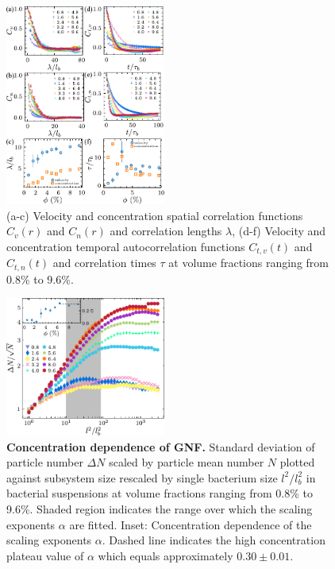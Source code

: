 \documentclass[twocolumn,aps,prl,amsmath,amssymb,longbibliography]{revtex4-2}
\begin{document}
\begin{figure}[ht]
\begin{center}
\includegraphics[width=0.47\textwidth]{figures/spatiotemporal-correlations/v3.pdf}
\caption[spatiotemporal-correlations.]
{
(a-c) Velocity and concentration spatial correlation functions $C_{v}(r)$  and $C_{n}(r)$ and correlation lengths $\lambda$,
(d-f) Velocity and concentration temporal autocorrelation functions $C_{t, v}(t)$  and $C_{t, n}(t)$ and correlation times $\tau$ at volume fractions ranging from 0.8\% to 9.6\%.
}
\label{fig:spatiotemporal-correlations}
\end{center}
\end{figure}

\begin{figure}[ht]
\begin{center}
\includegraphics[width=0.47\textwidth]{figures/GNF/v3.pdf}
\caption[Concentration dependence of GNF.]
{
\textbf{Concentration dependence of GNF.}
Standard deviation of particle number $\Delta N$ scaled by particle mean number $N$ plotted against subsystem size rescaled by single bacterium size $l^2/l_b^2$ in bacterial suspensions at volume fractions ranging from 0.8\% to 9.6\%. Shaded region indicates the range over which the scaling exponents $\alpha$ are fitted.
Inset: Concentration dependence of the scaling exponents $\alpha$. Dashed line indicates the high concentration plateau value of $\alpha$ which equals approximately $0.30 \pm 0.01$.
}
\label{fig:GNF}
\end{center}
\end{figure}
\end{document}

